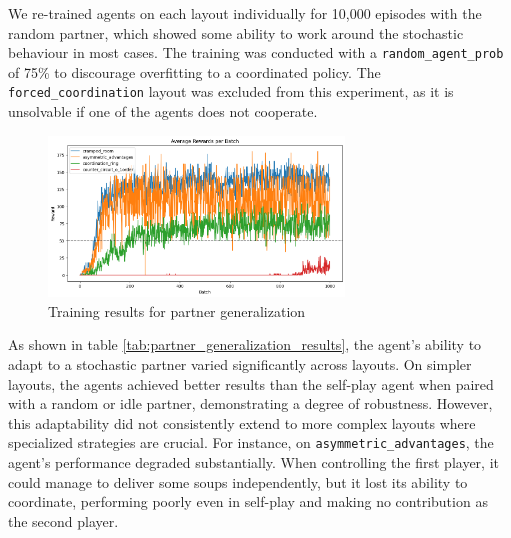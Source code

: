 \documentclass{article}
\begin{document}
We re-trained agents on each layout individually for 10,000 episodes with the random partner, which showed some ability to work around the stochastic behaviour in most cases. The training was conducted with a \texttt{random\_agent\_prob} of 75\% to discourage overfitting to a coordinated policy. The \texttt{forced\_coordination} layout was excluded from this experiment, as it is unsolvable if one of the agents does not cooperate.

\begin{figure}[ht]
\centering
\includegraphics[width=0.7\textwidth]{../plots/mean_random_rewards.png}
\caption{Training results for partner generalization}
\label{fig:partner_generalization_rewards}
\end{figure}


As shown in table \ref{tab:partner_generalization_results}, the agent's ability to adapt to a stochastic partner varied significantly across layouts. On simpler layouts, the agents achieved better results than the self-play agent when paired with a random or idle partner, demonstrating a degree of robustness. However, this adaptability did not consistently extend to more complex layouts where specialized strategies are crucial. For instance, on \texttt{asymmetric\_advantages}, the agent's performance degraded substantially. When controlling the first player, it could manage to deliver some soups independently, but it lost its ability to coordinate, performing poorly even in self-play and making no contribution as the second player.
\end{document}
